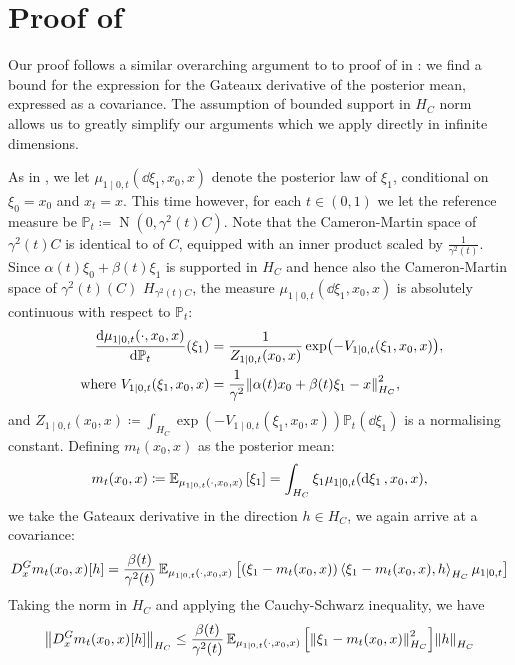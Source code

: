 \section{Proof of }
Our proof follows a similar overarching argument to to proof of  in : we find a bound for the expression for the Gateaux derivative of the posterior mean, expressed as a covariance. The assumption of bounded support in \(H_{C}\) norm allows us to greatly simplify our arguments which we apply directly in infinite dimensions.

As in , we let \(\mu_{1 \mid 0, t}(\dd{\xi_{1}}, x_{0}, x)\) denote the posterior law of \(\xi_{1}\), conditional on \(\xi_{0} = x_{0}\) and \(x_{t} = x\). This time however, for each \(t \in (0, 1)\) we let the reference measure be \(\mathbb{P}_{t} \coloneqq \operatorname{N}(0, \gamma^{2}(t) C)\). Note that the Cameron-Martin space of \(\gamma^{2}(t)C\) is identical to of \(C\), equipped with an inner product scaled by \(\frac{1}{\gamma^{2}(t)}\). Since \(\alpha(t)\xi_{0} + \beta(t) \xi_{1}\) is supported in \(H_{C}\) and hence also the Cameron-Martin space of \(\gamma^{2}(t)(C)\) \(H_{\gamma^{2}(t)C}\), the measure \(\mu_{1 \mid 0, t}(\dd{\xi_{1}}, x_{0}, x)\) is absolutely continuous with respect to \(\mathbb{P}_{t}\):
\begin{align*}
  \dv{\mu_{1 \mid 0, t}(\cdot, x_{0}, x)}{\mathbb{P}_{t}}{}(\xi_{1}) &= \frac{1}{Z_{1 \mid 0, t}(x_{0}, x)}\exp(-V_{1 \mid 0, t}(\xi_{1}, x_{0}, x)), \\
  \text{ where } V_{1 \mid 0, t}(\xi_{1}, x_{0}, x) &= \frac{1}{\gamma^{2}} \norm{\alpha(t) x_{0} + \beta(t) \xi_{1} - x}_{H_{C}}^{2},
\end{align*}
and \(Z_{1 \mid 0, t}(x_{0}, x) \coloneqq \int_{H_{C}} \exp(-V_{1 \mid 0, t}(\xi_{1}, x_{0}, x)) \mathbb{P}_{t}(\dd{\xi_{1}})\) is a normalising constant. Defining \(m_{t}(x_{0}, x)\) as the posterior mean:
\[
  m_{t}(x_{0}, x) \coloneqq \mathop{\mathbb{E}_{\mu_{1 \mid 0, t}(\cdot, x_{0}, x)}}\qty[\xi_{1}] = \int_{H_{C}} \xi_{1} \mu_{1 \mid 0, t}(\dd{\xi_{1}}, x_{0}, x),
\]
we take the Gateaux derivative in the direction \(h \in H_{C}\), we again arrive at a covariance:
\[
  D^{G}_{x} m_{t}(x_{0}, x)[h] = \frac{\beta(t)}{\gamma^{2}(t)} \mathop{\mathbb{E}_{\mu_{1 \mid 0, t}(\cdot, x_{0}, x)}}\qty[ (\xi_{1} - m_{t}(x_{0}, x))\ev{\xi_{1} - m_{t}(x_{0}, x), h}_{H_{C}} \mu_{1 \mid 0, t}]
\]
Taking the norm in \(H_{C}\) and applying the Cauchy-Schwarz inequality, we have
\[
  \norm{D_{x}^{G} m_{t}(x_{0}, x)[h]}_{H_{C}} \leq \frac{\beta(t)}{\gamma^{2}(t)} \mathop{\mathbb{E}_{\mu_{1 \mid 0, t}(\cdot, x_{0}, x)}}\qty[\norm{\xi_{1} - m_{t}(x_{0}, x)}_{H_{C}}^{2}] \norm{h}_{H_{C}}
\]
